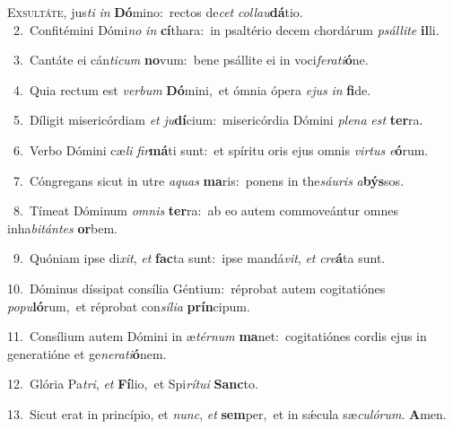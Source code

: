 \lettrine{\initial\textcolor{\initialcolor}{E}}{xsultáte,} jus\textit{ti} \textit{in} \textbf{Dó}\-mino:~\star rectos de\textit{cet} \textit{col}\-\textit{lau}\textbf{dá}tio.\\
{\numbfont\textcolor{\numbcolor}{~2.}}~Confitémini Dómi\textit{no} \textit{in} \textbf{cí}\-thara:~\star in psaltério decem chordárum \textit{psál}\-\textit{li}\textit{te} \textbf{il}\-li.\par
{\numbfont\textcolor{\numbcolor}{~3.}}~Cantáte ei cán\-\textit{ti}\-\textit{cum} \textbf{no}\-vum:~\star bene psállite ei in voci\-\textit{fe}\-\textit{ra}\textit{ti}\textbf{ó}ne.\par
{\numbfont\textcolor{\numbcolor}{~4.}}~Quia rectum est \textit{ver}\-\textit{bum} \textbf{Dó}\-mini,~\star et ómnia ópera \textit{e}\-\textit{jus} \textit{in} \textbf{fi}\-de.\par
{\numbfont\textcolor{\numbcolor}{~5.}}~Díligit misericórdiam \textit{et} \textit{ju}\-\textbf{dí}cium:~\star misericórdia Dómini \textit{ple}\-\textit{na} \textit{est} \textbf{ter}\-ra.\par
{\numbfont\textcolor{\numbcolor}{~6.}}~Verbo Dómini cæ\textit{li} \textit{fir}\-\textbf{má}ti sunt:~\star et spíritu oris ejus omnis \textit{vir}\-\textit{tus} \textit{e}\-\textbf{ó}rum.\par
{\numbfont\textcolor{\numbcolor}{~7.}}~Cóngregans sicut in utre \textit{a}\-\textit{quas} \textbf{ma}\-ris:~\star ponens in the\-\textit{sáu}\-\textit{ris} \textit{a}\-\textbf{býs}sos.\par
{\numbfont\textcolor{\numbcolor}{~8.}}~Tímeat Dóminum \textit{om}\-\textit{nis} \textbf{ter}\-ra:~\star ab eo autem commoveántur omnes inha\-\textit{bi}\-\textit{tán}\textit{tes} \textbf{or}\-bem.\par
{\numbfont\textcolor{\numbcolor}{~9.}}~Quóniam ipse di\-\textit{xit}\-, \textit{et} \textbf{fac}\-ta sunt:~\star ipse mandá\-\textit{vit}\-, \textit{et} \textit{cre}\-\textbf{á}ta sunt.\par
{\numbfont\textcolor{\numbcolor}{10.}}~Dóminus díssipat consília Géntium:~\dagger réprobat autem cogitatiónes \textit{po}\-\textit{pu}\textbf{ló}rum,~\star et réprobat con\-\textit{sí}\-\textit{li}\textit{a} \textbf{prín}\-cipum.\par
{\numbfont\textcolor{\numbcolor}{11.}}~Consílium autem Dómini in æ\-\textit{tér}\-\textit{num} \textbf{ma}\-net:~\star cogitatiónes cordis ejus in generatióne et ge\-\textit{ne}\-\textit{ra}\textit{ti}\textbf{ó}nem.\par
{\numbfont\textcolor{\numbcolor}{12.}}~Glória Pa\-\textit{tri}\-, \textit{et} \textbf{Fí}\-lio,~\star et Spi\-\textit{rí}\-\textit{tu}\textit{i} \textbf{Sanc}\-to.\par
{\numbfont\textcolor{\numbcolor}{13.}}~Sicut erat in princípio, et \textit{nunc}\-, \textit{et} \textbf{sem}\-per,~\star et in sǽcula sæ\-\textit{cu}\-\textit{ló}\textit{rum}. \textbf{A}\-men.\par
